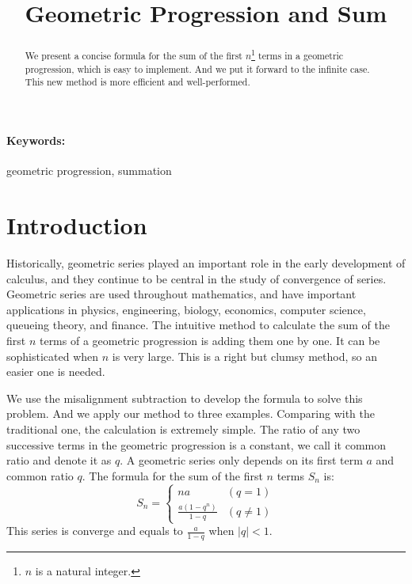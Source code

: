 
\title{Geometric Progression and Sum}
\author{}
\date{}

\maketitle



\begin{abstract}
    We present a concise formula for the sum of the first $n$\footnote{$n$ is a natural integer.} terms in a geometric progression, which is easy to implement. And we put it forward to the infinite case. This new method is more efficient and well-performed.
\end{abstract}
\paragraph{Keywords:} geometric progression, summation



\section{Introduction}\label{S:introduction}
Historically, geometric series played an important role in the early development of calculus, and they continue to be central in the study of convergence of series. Geometric series are used throughout mathematics, and have important applications in physics, engineering, biology, economics, computer science, queueing theory, and finance. The intuitive method to calculate the sum of the first $n$ terms of a geometric progression is adding them one by one. It can be sophisticated when $n$ is very large. This is a right but clumsy method, so an easier one is needed. 

We use the misalignment subtraction to develop the formula to solve this problem. And we apply our method to three examples. Comparing with the traditional one, the calculation is extremely simple. The ratio of any two successive terms in the geometric progression is a constant, we call it common ratio and denote it as $q$. A geometric series only depends on its first term $a$ and common ratio $q$. The formula for the sum of the first $n$ terms $S_n$ is:
\begin{equation*}
    S_n = \begin{cases}
        na & (q=1) \\
        \frac{{a\left(1-q^{{n}}\right)}}{{1-q}} & (q\neq 1)
        \end{cases}
\end{equation*}
This series is converge and equals to $\frac{{a}}{{1-q}}$ when $|q|<1$.

